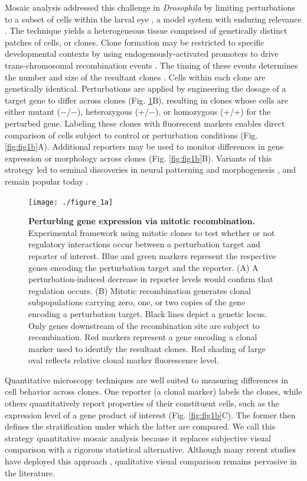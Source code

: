 Mosaic analysis addressed this challenge in \textit{Drosophila} by limiting perturbations to a subset of cells within the larval eye \cite{Xu1993,Xu2012}, a model system with enduring relevance \cite{Beira2016}. The technique yields a heterogeneous tissue comprised of genetically distinct patches of cells, or clones. Clone formation may be restricted to specific developmental contexts by using endogenously-activated promoters to drive trans-chromosomal recombination events \cite{Newsome2000,Theodosiou1998}. The timing of these events determines the number and size of the resultant clones \cite{Struhl1993}. Cells within each clone are genetically identical. Perturbations are applied by engineering the dosage of a target gene to differ across clones (Fig. \ref{fig:fig1a}B), resulting in clones whose cells are either mutant ($-$/$-$), heterozygous (+/$-$), or homozygous (+/+) for the perturbed gene. Labeling these clones with fluorescent markers enables direct comparison of cells subject to control or perturbation conditions (Fig. \ref{fig:fig1b}A). Additional reporters may be used to monitor differences in gene expression or morphology across clones (Fig. \ref{fig:fig1b}B). Variants of this strategy led to seminal discoveries in neural patterning \cite{Halfar2001,Tomlinson2001,Yang2001} and morphogenesis \cite{Huang2005,Thompson2006}, and remain popular today \cite{Atkins2019,Enomoto2018,Germani2018}.

\begin{figure}[!h]
\centering
\texttt{[image: ./figure\_1a]}
\caption[Perturbing gene expression via mitotic recombination.]{\textbf{Perturbing gene expression via mitotic recombination.} Experimental framework using mitotic clones to test whether or not regulatory interactions occur between a perturbation target and reporter of interest. Blue and green markers represent the respective genes encoding the perturbation target and the reporter. (A) A perturbation-induced decrease in reporter levels would confirm that regulation occurs. (B) Mitotic recombination generates clonal subpopulations carrying zero, one, or two copies of the gene encoding a perturbation target. Black lines depict a genetic locus. Only genes downstream of the recombination site are subject to recombination. Red markers represent a gene encoding a clonal marker used to identify the resultant clones. Red shading of large oval reflects relative clonal marker fluorescence level.}
\label{fig:fig1a}
\end{figure}

Quantitative microscopy techniques are well suited to measuring differences in cell behavior across clones. One reporter (a clonal marker) labels the clones, while others quantitatively report properties of their constituent cells, such as the expression level of a gene product of interest (Fig. \ref{fig:fig1b}C). The former then defines the stratification under which the latter are compared. We call this strategy quantitative mosaic analysis because it replaces subjective visual comparison with a rigorous statistical alternative. Although many recent studies have deployed this approach \cite{Dai2017,Bernasek2018,Ghiglione2018,Li2018}, qualitative visual comparison remains pervasive in the literature.

